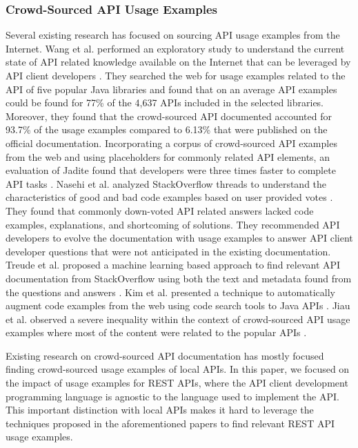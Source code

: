 \documentclass[conference]{IEEEtran}
\begin{document}
\subsubsection{Crowd-Sourced API Usage Examples}
Several existing research has focused on sourcing API usage examples from the Internet. Wang et al. performed an exploratory study to understand the current state of API related knowledge available on the Internet that can be leveraged by API client developers \cite{6462686}. They searched the web for usage examples related to the API of five popular Java libraries and found that on an average API examples could be found for 77\% of the 4,637 APIs included in the selected libraries. Moreover, they found that the crowd-sourced API documented accounted for 93.7\% of the usage examples compared to 6.13\% that were published on the official documentation. Incorporating a corpus of crowd-sourced API examples from the web and using placeholders for commonly related API elements, an evaluation of Jadite found that developers were three times faster to complete API tasks \cite{5295283}. Nasehi et al. analyzed StackOverflow threads to understand the characteristics of good and bad code examples based on user provided votes \cite{Nasehi_what_makes}. They found that commonly down-voted API related answers lacked code examples, explanations, and shortcoming of solutions. They recommended API developers to evolve the documentation with usage examples to answer API client developer questions that were not anticipated in the existing documentation. Treude et al. proposed a machine learning based approach to find relevant API documentation from StackOverflow using both the text and metadata found from the questions and answers \cite{Treude:2016:AAD:2884781.2884800}. Kim et al. presented a technique to automatically augment code examples from the web using code search tools to Java APIs \cite{Kim:2009:AEJ:1747491.1747552}. Jiau et al. observed a severe inequality within the context of crowd-sourced API usage examples where most of the content were related to the popular APIs \cite{jiau}.

Existing research on crowd-sourced API documentation has mostly focused finding crowd-sourced usage examples of local APIs. In this paper, we focused on the impact of usage examples for REST APIs, where the API client development programming language is agnostic to the language used to implement the API. This important distinction with local APIs makes it hard to leverage the techniques proposed in the aforementioned papers to find relevant REST API usage examples.
\end{document}
